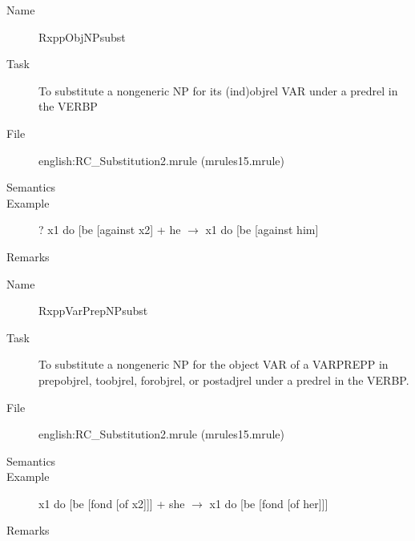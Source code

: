 \begin{description}
\vspace{1 cm}
\begin{description}
\item[Name] RxppObjNPsubst
\item[Task] To substitute a nongeneric NP for its (ind)objrel VAR under a 
predrel in the VERBP
\item[File] english:RC\_Substitution2.mrule (mrules15.mrule)
\item[Semantics]
\item[Example] ? x1 do [be [against x2] + he $\rightarrow$ x1 do [be [against 
him]
\item[Remarks]
\end{description}

\vspace{1 cm}
\begin{description}
\item[Name] RxppVarPrepNPsubst
\item[Task] To substitute a nongeneric NP for the object VAR of a VARPREPP in 
prepobjrel, toobjrel, forobjrel, or postadjrel under a predrel in the VERBP.
\item[File] english:RC\_Substitution2.mrule (mrules15.mrule)
\item[Semantics]
\item[Example] x1 do [be [fond [of x2]]] + she $\rightarrow$ x1 do [be [fond 
[of her]]]
\item[Remarks]
\end{description}

\end{description}

\newpage
